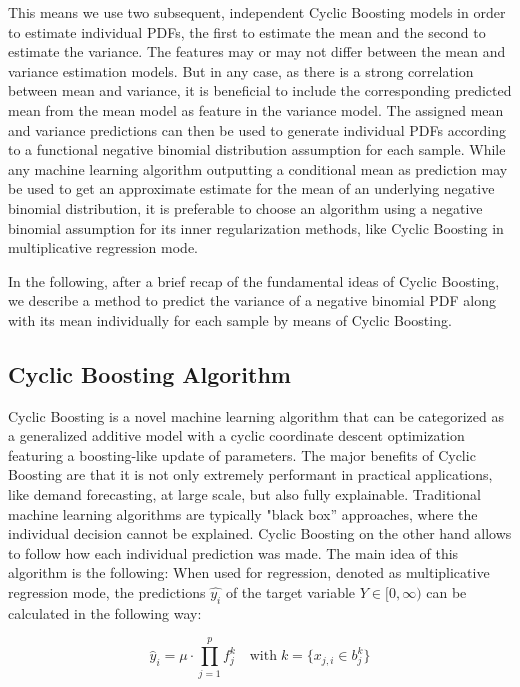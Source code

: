 \documentclass[BCOR=1mm, DIV=calc,10pt,
twoside=true,
twocolumn,
headings=normal]{scrartcl}
\begin{document}
This means we use two subsequent, independent Cyclic Boosting models in order to estimate individual PDFs, the first to estimate the mean and the second to estimate the variance. The features may or may not differ between the mean and variance estimation models. But in any case, as there is a strong correlation between mean and variance, it is beneficial to include the corresponding predicted mean from the mean model as feature in the variance model. The assigned mean and variance predictions can then be used to generate individual PDFs according to a functional negative binomial distribution assumption for each sample. While any machine learning algorithm outputting a conditional mean as prediction may be used to get an approximate estimate for the mean of an underlying negative binomial distribution, it is preferable to choose an algorithm using a negative binomial assumption for its inner regularization methods, like Cyclic Boosting in multiplicative regression mode.

In the following, after a brief recap of the fundamental ideas of Cyclic Boosting, we describe a method to predict the variance of a negative binomial PDF along with its mean individually for each sample by means of Cyclic Boosting.

\subsection{Cyclic Boosting Algorithm}
\label{sec:CB}

Cyclic Boosting \cite{Wick2019} is a novel machine learning algorithm that can be categorized as a generalized additive model with a cyclic coordinate descent optimization featuring a boosting-like update of parameters. The major benefits of Cyclic Boosting are that it is not only extremely performant in practical applications, like demand forecasting, at large scale, but also fully explainable. Traditional machine learning algorithms are typically "black box'' approaches, where the individual decision cannot be explained. Cyclic Boosting on the other hand allows to follow how each individual prediction was made. The main idea of this algorithm is the following: When used for regression, denoted as multiplicative regression mode, the predictions $\hat{y_i}$ of the  target variable $Y \in [0,\infty)$ can be calculated in the following way:

\begin{equation} \label{eqn:cb}
\hat{y}_i = \mu \cdot \prod \limits_{j=1}^p f^k_j \quad \text{with}\; k=\{ x_{j,i} \in b^k_j\}
\end{equation}
\end{document}

